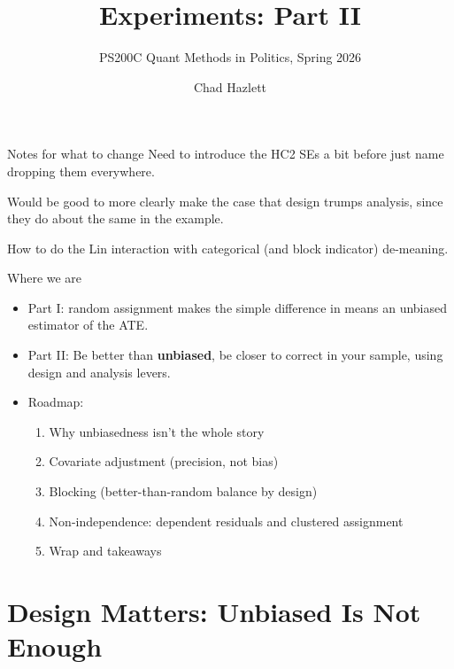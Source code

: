 \documentclass[xcolor=dvipsnames]{beamer}
\title[]{Experiments: Part II}
\subtitle[ ]{PS200C Quant Methods in Politics, Spring 2026}
\author[Hazlett]{Chad Hazlett }
\institute[UCLA]{UCLA\\[1ex]
  \texttt{chazlett@ucla.edu}
}
\date{}
\begin{document}
\begin{frame}
  \titlepage
\end{frame}

\begin{frame}{Notes for what to change}
Need to introduce the HC2 SEs a bit before just name dropping them everywhere. 

Would be good to more clearly make the case that design trumps analysis, since they do about the same in the example. 

How to do the Lin interaction with categorical (and block indicator) de-meaning.

\end{frame}
\begin{frame}{Where we are}
\begin{itemize}
\item Part I: random assignment makes the simple difference in means an
  unbiased estimator of the ATE. \medskip
\item Part II: Be better than \textbf{unbiased}, be closer to correct in your sample, using design and analysis levers.\medskip
\item Roadmap:
\begin{enumerate}
\footnotesize
\item Why unbiasedness isn't the whole story
\item Covariate adjustment (precision, not bias)
\item Blocking (better-than-random balance by design)
\item Non-independence: dependent residuals and clustered assignment
\item Wrap and takeaways
\end{enumerate}
\end{itemize}
\end{frame}


\section{Design Matters: Unbiased Is Not Enough}
\end{document}
